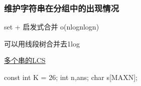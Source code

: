\documentclass[
]{article}
\newenvironment{Shaded}{}{}
\newcommand{\AttributeTok}[1]{\textcolor[rgb]{0.49,0.56,0.16}{#1}}
\newcommand{\DataTypeTok}[1]{\textcolor[rgb]{0.56,0.13,0.00}{#1}}
\newcommand{\DecValTok}[1]{\textcolor[rgb]{0.25,0.63,0.44}{#1}}
\newcommand{\NormalTok}[1]{#1}
\begin{document}
\hypertarget{ux7ef4ux62a4ux5b57ux7b26ux4e32ux5728ux5206ux7ec4ux4e2dux7684ux51faux73b0ux60c5ux51b5}{%
\subsubsection{维护字符串在分组中的出现情况}\label{ux7ef4ux62a4ux5b57ux7b26ux4e32ux5728ux5206ux7ec4ux4e2dux7684ux51faux73b0ux60c5ux51b5}}

set + 启发式合并 o(nlognlogn)

可以用线段树合并去1log

\href{https://www.luogu.com.cn/problem/SP10570}{多个串的LCS}

\begin{Shaded}
\begin{Highlighting}[]
\AttributeTok{const} \DataTypeTok{int}\NormalTok{ K = }\DecValTok{26}\NormalTok{;}
\DataTypeTok{int}\NormalTok{ n,ans;}
\DataTypeTok{char}\NormalTok{ s[MAXN];}


\end{Highlighting}
\end{Shaded}
\end{document}
